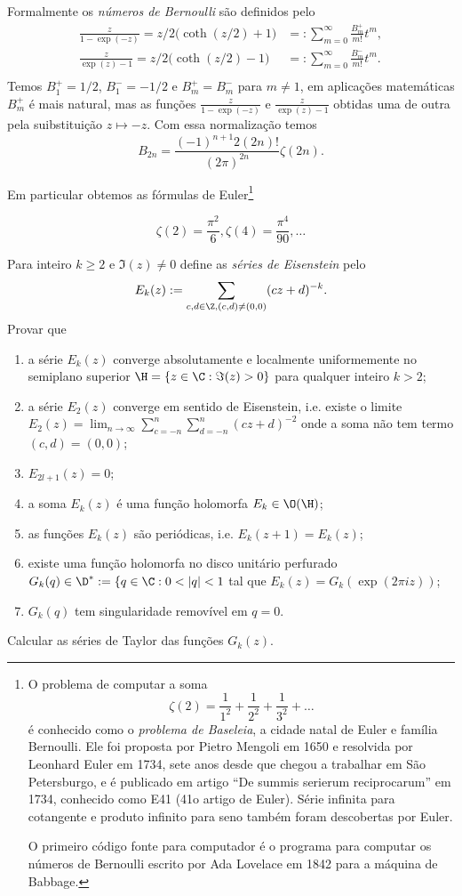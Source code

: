 Formalmente os \emph{números de Bernoulli} são definidos pelo
\begin{align}
\frac{z}{1-\exp(-z)} = z/2 \big(\coth(z/2)+1) &=: \sum_{m=0}^\infty \frac{B_m^+}{m!} t^m, \\
\frac{z}{\exp(z)-1} = z/2 \big(\coth(z/2)-1) &=: \sum_{m=0}^\infty \frac{B_m^-}{m!} t^m. \\
\end{align}
Temos $B_1^+ = 1/2$, $B_1^- = -1/2$ e $B_m^+ = B_m^-$ para $m\neq 1$,
em aplicações matemáticas $B_m^+$ é mais natural,
mas as funções $\frac{z}{1-\exp(-z)}$ e $\frac{z}{\exp(z)-1}$ obtidas uma de outra
pela suibstituição $z\mapsto -z$.
Com essa normalização temos
\begin{equation}
B_{2n} = \frac{(-1)^{n+1} 2 (2n)!}{(2\pi)^{2n}} \zeta(2n).
\end{equation}

Em particular obtemos as fórmulas de Euler\footnote{
O problema de computar a soma
\[ \zeta(2) = \frac{1}{1^2} + \frac{1}{2^2} + \frac{1}{3^2} + \dots \]
é conhecido como o \emph{problema de Baseleia},
a cidade natal de Euler e família Bernoulli.
Ele foi proposta por Pietro Mengoli em 1650 e resolvida
por Leonhard Euler em 1734, sete anos desde que chegou a trabalhar
em São Petersburgo, e é publicado em artigo ``De summis serierum reciprocarum''
em 1734, conhecido como E41 (41o artigo de Euler).
Série infinita para cotangente e produto infinito para seno
também foram descobertas por Euler.

O primeiro código fonte para computador é o programa para computar os números
de Bernoulli escrito por Ada Lovelace em 1842 para a máquina de Babbage.}

\[ \zeta(2) = \frac{\pi^2}{6}, \zeta(4) = \frac{\pi^4}{90}, \dots \]


\begin{problema}
Para inteiro $k\geq 2$ e $\Im(z)\neq 0$ define as \emph{séries de Eisenstein} pelo
\begin{equation}
E_k(z) := \sum_{c,d\in \Z, (c,d)\neq(0,0)} (cz+d)^{-k} .
\end{equation}
Provar que
\begin{enumerate}
\item a série $E_k(z)$ converge
absolutamente e localmente uniformemente no semiplano superior
$\H = \{z\in\C: \Im(z)>0\}$ para qualquer inteiro $k>2$;
\item a série $E_2(z)$ converge em sentido de Eisenstein,
i.e. existe o limite $E_2(z) = \lim_{n\to\infty} \sum_{c=-n}^n\sum_{d=-n}^n (cz+d)^{-2}$
onde a soma não tem termo $(c,d)=(0,0)$;
\item $E_{2l+1}(z) = 0$;
\item a soma $E_k(z)$ é uma função holomorfa $E_k \in \O(\H)$;
\item as funções $E_k(z)$ são periódicas, i.e. $E_k(z+1) = E_k(z)$;
\item existe uma função holomorfa no disco unitário perfurado
$G_k(q) \in \D^* := \{q\in\C: 0 < |q| < 1$ tal que $E_k(z) = G_k(\exp(2\pi i z))$;
\item $G_k(q)$ tem singularidade removível em $q=0$.
\end{enumerate}
\end{problema}

\begin{problema}
Calcular as séries de Taylor das funções $G_k(z)$.
\end{problema}


